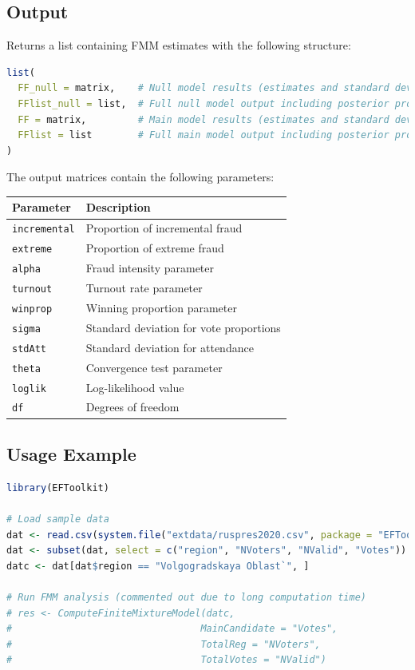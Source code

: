 \documentclass{article}
\begin{document}
\subsection{Output}
Returns a list containing FMM estimates with the following structure:

\begin{lstlisting}[language=R]
list(
  FF_null = matrix,    # Null model results (estimates and standard deviations)
  FFlist_null = list,  # Full null model output including posterior probabilities
  FF = matrix,         # Main model results (estimates and standard deviations)
  FFlist = list        # Full main model output including posterior probabilities
)
\end{lstlisting}

The output matrices contain the following parameters:

\begin{longtable}{p{3cm}p{11cm}}
\toprule
\textbf{Parameter} & \textbf{Description} \\
\midrule
\texttt{incremental} & Proportion of incremental fraud \\
\texttt{extreme} & Proportion of extreme fraud \\
\texttt{alpha} & Fraud intensity parameter \\
\texttt{turnout} & Turnout rate parameter \\
\texttt{winprop} & Winning proportion parameter \\
\texttt{sigma} & Standard deviation for vote proportions \\
\texttt{stdAtt} & Standard deviation for attendance \\
\texttt{theta} & Convergence test parameter \\
\texttt{loglik} & Log-likelihood value \\
\texttt{df} & Degrees of freedom \\
\bottomrule
\end{longtable}

\subsection{Usage Example}
\begin{lstlisting}[language=R]
library(EFToolkit)

# Load sample data
dat <- read.csv(system.file("extdata/ruspres2020.csv", package = "EFToolkit"))
dat <- subset(dat, select = c("region", "NVoters", "NValid", "Votes"))
datc <- dat[dat$region == "Volgogradskaya Oblast`", ]

# Run FMM analysis (commented out due to long computation time)
# res <- ComputeFiniteMixtureModel(datc,
#                                 MainCandidate = "Votes",
#                                 TotalReg = "NVoters", 
#                                 TotalVotes = "NValid")
\end{lstlisting}
\end{document}
